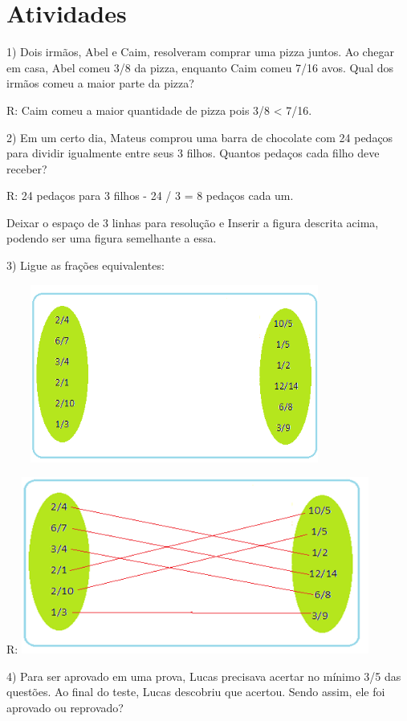 \section{Atividades}

1) Dois irmãos, Abel e Caim, resolveram comprar uma pizza juntos. Ao
chegar em casa, Abel comeu 3/8 da pizza, enquanto Caim comeu 7/16 avos.
Qual dos irmãos comeu a maior parte da pizza?

R: Caim comeu a maior quantidade de pizza pois 3/8 \textless{} 7/16.

2) Em um certo dia, Mateus comprou uma barra de chocolate com 24 pedaços
para dividir igualmente entre seus 3 filhos. Quantos pedaços cada filho
deve receber?

R: 24 pedaços para 3 filhos - 24 / 3 = 8 pedaços cada um.

Deixar o espaço de 3 linhas para resolução e Inserir a figura descrita
acima, podendo ser uma figura semelhante a essa.

3) Ligue as frações equivalentes:

\includegraphics[width=4.35393in,height=2.301in]{./imgSAEB_6_MAT/media/image30.png}

R:
\includegraphics[width=4.5116in,height=2.28926in]{./imgSAEB_6_MAT/media/image31.png}

4) Para ser aprovado em uma prova, Lucas precisava acertar no mínimo 3/5
das questões. Ao final do teste, Lucas descobriu que acertou. Sendo
assim, ele foi aprovado ou reprovado?

